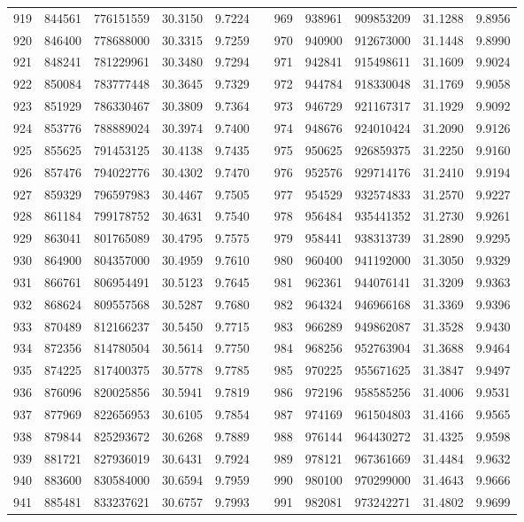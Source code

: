 \begin{longtable}{rrrrrrrrrrr}
919&844561&776151559&30.3150&9.7224&&969&938961&909853209&31.1288&9.8956\\
920&846400&778688000&30.3315&9.7259&&970&940900&912673000&31.1448&9.8990\\
921&848241&781229961&30.3480&9.7294&&971&942841&915498611&31.1609&9.9024\\
922&850084&783777448&30.3645&9.7329&&972&944784&918330048&31.1769&9.9058\\
923&851929&786330467&30.3809&9.7364&&973&946729&921167317&31.1929&9.9092\\
924&853776&788889024&30.3974&9.7400&&974&948676&924010424&31.2090&9.9126\\
925&855625&791453125&30.4138&9.7435&&975&950625&926859375&31.2250&9.9160\\
926&857476&794022776&30.4302&9.7470&&976&952576&929714176&31.2410&9.9194\\
927&859329&796597983&30.4467&9.7505&&977&954529&932574833&31.2570&9.9227\\
928&861184&799178752&30.4631&9.7540&&978&956484&935441352&31.2730&9.9261\\
929&863041&801765089&30.4795&9.7575&&979&958441&938313739&31.2890&9.9295\\
930&864900&804357000&30.4959&9.7610&&980&960400&941192000&31.3050&9.9329\\
931&866761&806954491&30.5123&9.7645&&981&962361&944076141&31.3209&9.9363\\
932&868624&809557568&30.5287&9.7680&&982&964324&946966168&31.3369&9.9396\\
933&870489&812166237&30.5450&9.7715&&983&966289&949862087&31.3528&9.9430\\
934&872356&814780504&30.5614&9.7750&&984&968256&952763904&31.3688&9.9464\\
935&874225&817400375&30.5778&9.7785&&985&970225&955671625&31.3847&9.9497\\
936&876096&820025856&30.5941&9.7819&&986&972196&958585256&31.4006&9.9531\\
937&877969&822656953&30.6105&9.7854&&987&974169&961504803&31.4166&9.9565\\
938&879844&825293672&30.6268&9.7889&&988&976144&964430272&31.4325&9.9598\\
939&881721&827936019&30.6431&9.7924&&989&978121&967361669&31.4484&9.9632\\
940&883600&830584000&30.6594&9.7959&&990&980100&970299000&31.4643&9.9666\\
941&885481&833237621&30.6757&9.7993&&991&982081&973242271&31.4802&9.9699\\

\end{longtable}
